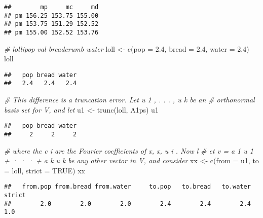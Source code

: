\documentclass[
]{article}
\newenvironment{Shaded}{\begin{snugshade}}{\end{snugshade}}
\newcommand{\AttributeTok}[1]{\textcolor[rgb]{0.77,0.63,0.00}{#1}}
\newcommand{\CommentTok}[1]{\textcolor[rgb]{0.56,0.35,0.01}{\textit{#1}}}
\newcommand{\ConstantTok}[1]{\textcolor[rgb]{0.00,0.00,0.00}{#1}}
\newcommand{\FloatTok}[1]{\textcolor[rgb]{0.00,0.00,0.81}{#1}}
\newcommand{\FunctionTok}[1]{\textcolor[rgb]{0.00,0.00,0.00}{#1}}
\newcommand{\NormalTok}[1]{#1}
\newcommand{\OtherTok}[1]{\textcolor[rgb]{0.56,0.35,0.01}{#1}}
\begin{document}
\begin{verbatim}
##        mp     mc     md
## pm 156.25 153.75 155.00
## pm 153.75 151.29 152.52
## pm 155.00 152.52 153.76
\end{verbatim}

\begin{Shaded}
\begin{Highlighting}[]
\CommentTok{\# lollipop val breadcrumb water}
\NormalTok{loll }\OtherTok{\textless{}{-}} \FunctionTok{c}\NormalTok{(}\AttributeTok{pop =} \FloatTok{2.4}\NormalTok{, }\AttributeTok{bread =} \FloatTok{2.4}\NormalTok{, }\AttributeTok{water =} \FloatTok{2.4}\NormalTok{)}
\NormalTok{loll}
\end{Highlighting}
\end{Shaded}

\begin{verbatim}
##   pop bread water 
##   2.4   2.4   2.4
\end{verbatim}

\begin{Shaded}
\begin{Highlighting}[]
\CommentTok{\# This difference is a truncation error. Let u 1 , . . . , u k be an }
\CommentTok{\# orthonormal basis set for V, and let}
\NormalTok{u1 }\OtherTok{\textless{}{-}} \FunctionTok{trunc}\NormalTok{(loll, A1ps)}
\NormalTok{u1}
\end{Highlighting}
\end{Shaded}

\begin{verbatim}
##   pop bread water 
##     2     2     2
\end{verbatim}

\begin{Shaded}
\begin{Highlighting}[]
\CommentTok{\# where the c i are the Fourier coeﬃcients of x, x, u i . Now l}
\CommentTok{\# et v = a 1 u 1 + · · · + a k u k be any other vector in V, and consider}
\NormalTok{xx }\OtherTok{\textless{}{-}} \FunctionTok{c}\NormalTok{(}\AttributeTok{from =}\NormalTok{ u1, }\AttributeTok{to =}\NormalTok{ loll, }\AttributeTok{strict =} \ConstantTok{TRUE}\NormalTok{)}
\NormalTok{xx}
\end{Highlighting}
\end{Shaded}

\begin{verbatim}
##   from.pop from.bread from.water     to.pop   to.bread   to.water     strict 
##        2.0        2.0        2.0        2.4        2.4        2.4        1.0
\end{verbatim}
\end{document}

